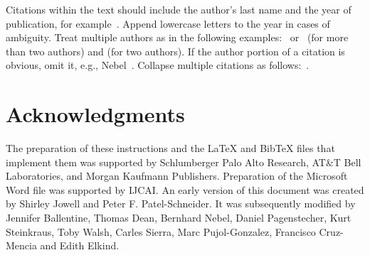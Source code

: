 \documentclass{article}
\begin{document}
Citations within the text should include the author's last name and
the year of publication, for example~\cite{gottlob:nonmon}.  Append
lowercase letters to the year in cases of ambiguity.  Treat multiple
authors as in the following examples:~\cite{abelson-et-al:scheme}
or~\cite{bgf:Lixto} (for more than two authors) and
\cite{brachman-schmolze:kl-one} (for two authors).  If the author
portion of a citation is obvious, omit it, e.g.,
Nebel~.  Collapse multiple citations as
follows:~\cite{gls:hypertrees,levesque:functional-foundations}.
\nocite{abelson-et-al:scheme}
\nocite{bgf:Lixto}
\nocite{brachman-schmolze:kl-one}
\nocite{gottlob:nonmon}
\nocite{gls:hypertrees}
\nocite{levesque:functional-foundations}
\nocite{levesque:belief}
\nocite{nebel:jair-2000}





\section*{Acknowledgments}

The preparation of these instructions and the \LaTeX{} and Bib\TeX{}
files that implement them was supported by Schlumberger Palo Alto
Research, AT\&T Bell Laboratories, and Morgan Kaufmann Publishers.
Preparation of the Microsoft Word file was supported by IJCAI.  An
early version of this document was created by Shirley Jowell and Peter
F. Patel-Schneider.  It was subsequently modified by Jennifer
Ballentine, Thomas Dean, Bernhard Nebel, Daniel Pagenstecher,
Kurt Steinkraus, Toby Walsh, Carles Sierra, Marc Pujol-Gonzalez,
Francisco Cruz-Mencia and Edith Elkind.




\end{document}
